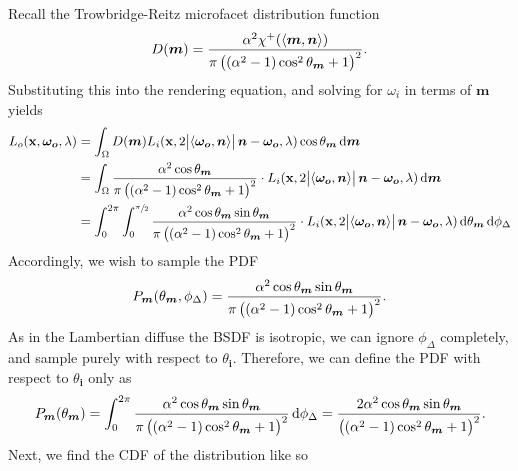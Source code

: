 \documentclass[12pt]{article}
\DeclarePairedDelimiter\ip{\langle }{\rangle}
\begin{document}
Recall the Trowbridge-Reitz microfacet distribution function
\[D(\bm m) = \frac{\alpha^2 \chi^+(\ip{\bm m, \bm n})}{\pi\del{\del{\alpha^2 - 1}\cos^2 \theta_{\bm m} + 1}^2}.\]
Substituting this into the rendering equation, and solving for \(\omega_i\) in terms of \(\bm m\) yields
\begin{align*}
  L_{o}(\mathbf x, \bm {\omega_{o}}, \lambda)
  &= \int_\Omega D(\bm m) L_i(\mathbf x, 2\abs{\ip{\bm{\omega_o}, \bm n}}\bm n-  \bm{\omega_o}, \lambda)\cos\theta_{\bm m} \dif \bm{m}\\
  &= \int_\Omega \frac{\alpha^2 \cos\theta_{\bm m} }{\pi\del{\del{\alpha^2 - 1}\cos^2 \theta_{\bm m} + 1}^2}\cdot L_i(\mathbf x, 2\abs{\ip{\bm{\omega_o}, \bm n}}\bm n-  \bm{\omega_o}, \lambda) \dif \bm{m}\\
  &= \int_0^{2\pi}\int_0^{\sfrac{\pi}{2}} \frac{\alpha^2 \cos\theta_{\bm m} \sin\theta_{\bm m}}{\pi\del{\del{\alpha^2 - 1}\cos^2 \theta_{\bm m} + 1}^2}\cdot L_i(\mathbf x, 2\abs{\ip{\bm{\omega_o}, \bm n}}\bm n-  \bm{\omega_o}, \lambda)\dif\theta_{\bm m}\dif\phi_\Delta\\
\end{align*}
Accordingly, we wish to sample the PDF
\[P_{\bm m}(\theta_{\bm m}, \phi_\Delta) = \frac{\alpha^2 \cos\theta_{\bm m} \sin\theta_{\bm m}}{\pi\del{\del{\alpha^2 - 1}\cos^2 \theta_{\bm m} + 1}^2} .\]
As in the Lambertian diffuse the BSDF is isotropic, we can ignore \(\phi_\Delta\) completely, and sample purely with respect to \(\theta_{\bm i}\).
Therefore, we can define the PDF with respect to \(\theta_{\bm i}\) only as
\[P_{\bm m}(\theta_{\bm m}) = \int_0^{2\pi}\frac{\alpha^2 \cos\theta_{\bm m} \sin\theta_{\bm m}}{\pi\del{\del{\alpha^2 - 1}\cos^2 \theta_{\bm m} + 1}^2}\dif\phi_\Delta = \frac{2\alpha^2 \cos\theta_{\bm m} \sin\theta_{\bm m}}{\del{\del{\alpha^2 - 1}\cos^2 \theta_{\bm m} + 1}^2}.\]
Next, we find the CDF of the distribution like so
\end{document}
